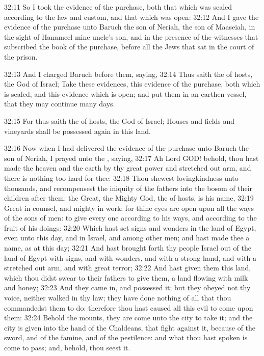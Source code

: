 32:11 So I took the evidence of the purchase, both that which was
sealed according to the law and custom, and that which was open: 32:12
And I gave the evidence of the purchase unto Baruch the son of Neriah,
the son of Maaseiah, in the sight of Hanameel mine uncle's son, and in
the presence of the witnesses that subscribed the book of the
purchase, before all the Jews that sat in the court of the prison.

32:13 And I charged Baruch before them, saying, 32:14 Thus saith the
\LORD of hosts, the God of Israel; Take these evidences, this evidence
of the purchase, both which is sealed, and this evidence which is
open; and put them in an earthen vessel, that they may continue many
days.

32:15 For thus saith the \LORD of hosts, the God of Israel; Houses and
fields and vineyards shall be possessed again in this land.

32:16 Now when I had delivered the evidence of the purchase unto
Baruch the son of Neriah, I prayed unto the \LORD, saying, 32:17 Ah
Lord GOD! behold, thou hast made the heaven and the earth by thy great
power and stretched out arm, and there is nothing too hard for thee:
32:18 Thou shewest lovingkindness unto thousands, and recompensest the
iniquity of the fathers into the bosom of their children after them:
the Great, the Mighty God, the \LORD of hosts, is his name, 32:19 Great
in counsel, and mighty in work: for thine eyes are open upon all the
ways of the sons of men: to give every one according to his ways, and
according to the fruit of his doings: 32:20 Which hast set signs and
wonders in the land of Egypt, even unto this day, and in Israel, and
among other men; and hast made thee a name, as at this day; 32:21 And
hast brought forth thy people Israel out of the land of Egypt with
signs, and with wonders, and with a strong hand, and with a stretched
out arm, and with great terror; 32:22 And hast given them this land,
which thou didst swear to their fathers to give them, a land flowing
with milk and honey; 32:23 And they came in, and possessed it; but
they obeyed not thy voice, neither walked in thy law; they have done
nothing of all that thou commandedst them to do: therefore thou hast
caused all this evil to come upon them: 32:24 Behold the mounts, they
are come unto the city to take it; and the city is given into the hand
of the Chaldeans, that fight against it, because of the sword, and of
the famine, and of the pestilence: and what thou hast spoken is come
to pass; and, behold, thou seest it.

